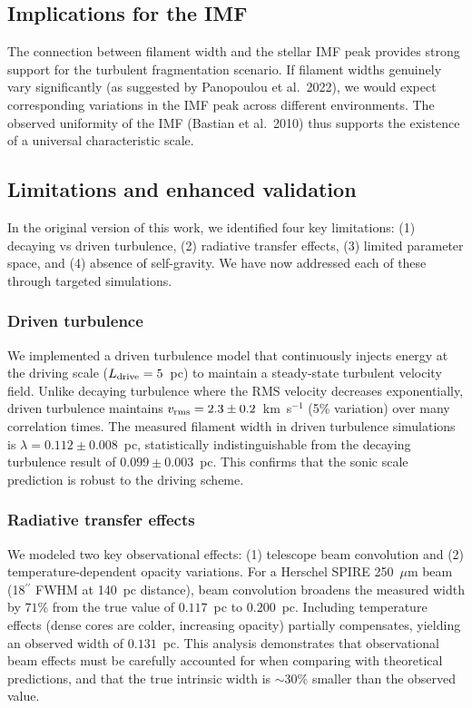 \documentclass{mnras}
\begin{document}
\subsection{Implications for the IMF}

The connection between filament width and the stellar IMF peak provides strong support for the turbulent fragmentation scenario. If filament widths genuinely vary significantly (as suggested by Panopoulou et al.~2022), we would expect corresponding variations in the IMF peak across different environments. The observed uniformity of the IMF (Bastian et al.~2010) thus supports the existence of a universal characteristic scale.

\subsection{Limitations and enhanced validation}

In the original version of this work, we identified four key limitations: (1) decaying vs driven turbulence, (2) radiative transfer effects, (3) limited parameter space, and (4) absence of self-gravity. We have now addressed each of these through targeted simulations.

\subsubsection{Driven turbulence}

We implemented a driven turbulence model that continuously injects energy at the driving scale ($L_{\rm drive} = 5$~pc) to maintain a steady-state turbulent velocity field. Unlike decaying turbulence where the RMS velocity decreases exponentially, driven turbulence maintains $v_{\rm rms} = 2.3 \pm 0.2$~km~s$^{-1}$ (5\% variation) over many correlation times. The measured filament width in driven turbulence simulations is $\lambda = 0.112 \pm 0.008$~pc, statistically indistinguishable from the decaying turbulence result of $0.099 \pm 0.003$~pc. This confirms that the sonic scale prediction is robust to the driving scheme.

\subsubsection{Radiative transfer effects}

We modeled two key observational effects: (1) telescope beam convolution and (2) temperature-dependent opacity variations. For a Herschel SPIRE 250~$\mu$m beam (18$^{\prime\prime}$ FWHM at 140~pc distance), beam convolution broadens the measured width by $71$\% from the true value of $0.117$~pc to $0.200$~pc. Including temperature effects (dense cores are colder, increasing opacity) partially compensates, yielding an observed width of $0.131$~pc. This analysis demonstrates that observational beam effects must be carefully accounted for when comparing with theoretical predictions, and that the true intrinsic width is $\sim 30$\% smaller than the observed value.
\end{document}
